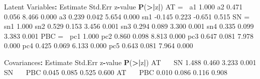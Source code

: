 \documentclass[]{article}
\newenvironment{Shaded}{\begin{snugshade}}{\end{snugshade}}
\newcommand{\ErrorTok}[1]{\textcolor[rgb]{0.64,0.00,0.00}{\textbf{#1}}}
\newcommand{\FloatTok}[1]{\textcolor[rgb]{0.00,0.00,0.81}{#1}}
\newcommand{\KeywordTok}[1]{\textcolor[rgb]{0.13,0.29,0.53}{\textbf{#1}}}
\newcommand{\NormalTok}[1]{#1}
\newcommand{\OperatorTok}[1]{\textcolor[rgb]{0.81,0.36,0.00}{\textbf{#1}}}
\newcommand{\StringTok}[1]{\textcolor[rgb]{0.31,0.60,0.02}{#1}}
\begin{document}
\begin{Shaded}
\begin{Highlighting}[]
\NormalTok{Latent Variables}\OperatorTok{:}
\StringTok{                   }\NormalTok{Estimate  Std.Err  z}\OperatorTok{-}\NormalTok{value  }\KeywordTok{P}\NormalTok{(}\OperatorTok{>}\ErrorTok{|}\NormalTok{z}\OperatorTok{|}\NormalTok{)}
\NormalTok{  AT =}\ErrorTok{~}\StringTok{                                               }
\StringTok{    }\NormalTok{a1                }\FloatTok{1.000}                           
\NormalTok{    a2                }\FloatTok{0.471}    \FloatTok{0.056}    \FloatTok{8.466}    \FloatTok{0.000}
\NormalTok{    a3                }\FloatTok{0.239}    \FloatTok{0.042}    \FloatTok{5.654}    \FloatTok{0.000}
\NormalTok{    sn1              }\FloatTok{-0.145}    \FloatTok{0.223}   \FloatTok{-0.651}    \FloatTok{0.515}
\NormalTok{  SN =}\ErrorTok{~}\StringTok{                                               }
\StringTok{    }\NormalTok{sn1               }\FloatTok{1.000}                           
\NormalTok{    sn2               }\FloatTok{0.529}    \FloatTok{0.153}    \FloatTok{3.456}    \FloatTok{0.001}
\NormalTok{    sn3               }\FloatTok{0.294}    \FloatTok{0.089}    \FloatTok{3.300}    \FloatTok{0.001}
\NormalTok{    sn4               }\FloatTok{0.335}    \FloatTok{0.099}    \FloatTok{3.383}    \FloatTok{0.001}
\NormalTok{  PBC =}\ErrorTok{~}\StringTok{                                              }
\StringTok{    }\NormalTok{pc1               }\FloatTok{1.000}                           
\NormalTok{    pc2               }\FloatTok{0.860}    \FloatTok{0.098}    \FloatTok{8.813}    \FloatTok{0.000}
\NormalTok{    pc3               }\FloatTok{0.647}    \FloatTok{0.081}    \FloatTok{7.978}    \FloatTok{0.000}
\NormalTok{    pc4               }\FloatTok{0.425}    \FloatTok{0.069}    \FloatTok{6.133}    \FloatTok{0.000}
\NormalTok{    pc5               }\FloatTok{0.643}    \FloatTok{0.081}    \FloatTok{7.964}    \FloatTok{0.000}

\NormalTok{Covariances}\OperatorTok{:}
\StringTok{                   }\NormalTok{Estimate  Std.Err  z}\OperatorTok{-}\NormalTok{value  }\KeywordTok{P}\NormalTok{(}\OperatorTok{>}\ErrorTok{|}\NormalTok{z}\OperatorTok{|}\NormalTok{)}
\NormalTok{  AT }\OperatorTok{~}\ErrorTok{~}\StringTok{                                               }
\StringTok{    }\NormalTok{SN                }\FloatTok{1.488}    \FloatTok{0.460}    \FloatTok{3.233}    \FloatTok{0.001}
\NormalTok{  SN }\OperatorTok{~}\ErrorTok{~}\StringTok{                                               }
\StringTok{    }\NormalTok{PBC               }\FloatTok{0.045}    \FloatTok{0.085}    \FloatTok{0.525}    \FloatTok{0.600}
\NormalTok{  AT }\OperatorTok{~}\ErrorTok{~}\StringTok{                                               }
\StringTok{    }\NormalTok{PBC               }\FloatTok{0.010}    \FloatTok{0.086}    \FloatTok{0.116}    \FloatTok{0.908}


\end{Highlighting}
\end{Shaded}
\end{document}
